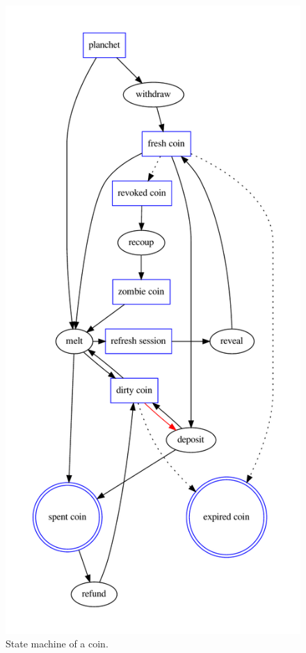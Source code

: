 \begin{figure}
  \begin{center}
    \includegraphics[scale=0.75]{taler/coin.pdf}
  \end{center}
  \caption{State machine of a coin.}
  \label{fig:coin:states}
\end{figure}





